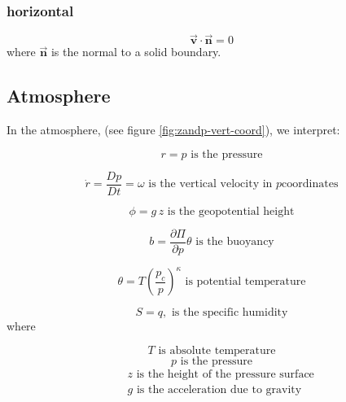 \subsubsection{horizontal}

\begin{equation}
\vec{\mathbf{v}}\cdot \vec{\mathbf{n}}=0  \label{eq:noflow}
\end{equation}
where $\vec{\mathbf{n}}$ is the normal to a solid boundary.

\subsection{Atmosphere}

In the atmosphere, (see figure \ref{fig:zandp-vert-coord}), we interpret:

\begin{equation}
r=p\text{ is the pressure}  \label{eq:atmos-r}
\end{equation}

\begin{equation}
\dot{r}=\frac{Dp}{Dt}=\omega \text{ is the vertical velocity in }p\text{
coordinates}  \label{eq:atmos-omega}
\end{equation}

\begin{equation}
\phi =g\,z\text{ is the geopotential height}  \label{eq:atmos-phi}
\end{equation}

\begin{equation}
b=\frac{\partial \Pi }{\partial p}\theta \text{ is the buoyancy}
\label{eq:atmos-b}
\end{equation}

\begin{equation}
\theta =T(\frac{p_{c}}{p})^{\kappa }\text{ is potential temperature}
\label{eq:atmos-theta}
\end{equation}

\begin{equation}
S=q,\text{ is the specific humidity}  \label{eq:atmos-s}
\end{equation}
where

\begin{equation*}
T\text{ is absolute temperature}
\end{equation*}
\begin{equation*}
p\text{ is the pressure}
\end{equation*}
\begin{eqnarray*}
&&z\text{ is the height of the pressure surface} \\
&&g\text{ is the acceleration due to gravity}
\end{eqnarray*}


